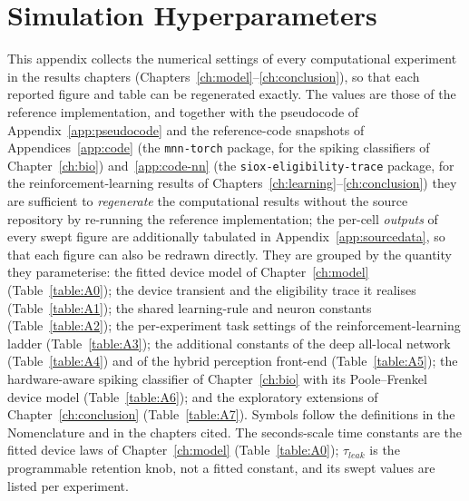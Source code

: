 \chapter{Simulation Hyperparameters}
\label{app:hyperparameters}

\noindent This appendix collects the numerical settings of every computational
experiment in the results chapters (Chapters~\ref{ch:model}--\ref{ch:conclusion}), so
that each reported figure and table can be regenerated exactly. The values are those of
the reference implementation, and together with the pseudocode of
Appendix~\ref{app:pseudocode} and the reference-code snapshots of
Appendices~\ref{app:code} (the \texttt{mnn-torch} package, for the spiking classifiers of
Chapter~\ref{ch:bio}) and~\ref{app:code-nn} (the \texttt{siox-eligibility-trace} package,
for the reinforcement-learning results of Chapters~\ref{ch:learning}--\ref{ch:conclusion})
they are sufficient to \emph{regenerate} the computational results without the source
repository by re-running the reference implementation; the per-cell \emph{outputs} of every swept
figure are additionally tabulated in Appendix~\ref{app:sourcedata}, so that each figure
can also be redrawn directly. They
are grouped by the quantity they parameterise: the fitted device model of
Chapter~\ref{ch:model} (Table~\ref{table:A0}); the device transient and the eligibility
trace it realises (Table~\ref{table:A1}); the shared learning-rule and neuron constants
(Table~\ref{table:A2}); the per-experiment task settings of the reinforcement-learning
ladder (Table~\ref{table:A3}); the additional constants of the deep all-local network
(Table~\ref{table:A4}) and of the hybrid perception front-end (Table~\ref{table:A5});
the hardware-aware spiking classifier of Chapter~\ref{ch:bio} with its Poole--Frenkel
device model (Table~\ref{table:A6}); and the exploratory extensions of
Chapter~\ref{ch:conclusion} (Table~\ref{table:A7}). Symbols follow the definitions in
the Nomenclature and in the chapters cited. The seconds-scale time constants are the
fitted device laws of Chapter~\ref{ch:model} (Table~\ref{table:A0}); $\tau_{leak}$ is
the programmable retention knob, not a fitted constant, and its swept values are listed
per experiment.

